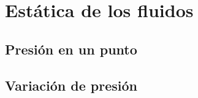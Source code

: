 \section{Estática de los fluidos}

\subsection{Presión en un punto}

\subsection{Variación de presión}